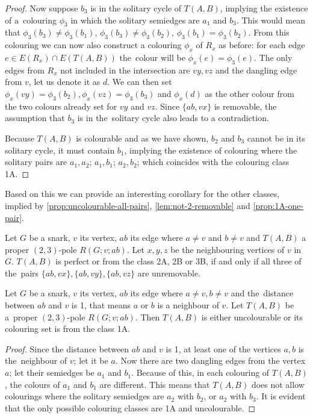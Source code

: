 \begin{proof}
	Now suppose $b_3$ is in the solitary cycle of $T(A,B)$, implying the existence of a~colouring $\phi_3$ in which the solitary semiedges are $a_1$ and $b_3$. This would mean that $\phi_3(b_3)\neq \phi_3(b_1)$, $\phi_3(b_3)\neq \phi_3(b_2)$, $\phi_3(b_1)= \phi_3(b_2)$. From this colouring we can now also construct a colouring $\phi_x$ of $R_x$ as before: for each edge $e\in E(R_x)\cap E(T(A,B))$ the~colour will be $\phi_x(e)=\phi_3(e)$. The only edges from $R_x$ not included in the intersection are $vy, vz$ and the dangling edge from $v$, let us denote it as $d$. We can then set $\phi_x(vy)=\phi_3(b_2), \phi_x(vz)=\phi_3(b_3)$ and $\phi_x(d)$ as the other colour from the two colours already set for $vy$ and $vz$. Since $\{ab,vx\}$ is removable, the assumption that $b_3$ is in the~solitary cycle also leads to a contradiction.
	
	Because $T(A,B)$ is colourable and as we have shown, $b_2$ and $b_3$ cannot be in its solitary cycle, it must contain $b_1$, implying the existence of colouring where the solitary pairs are $a_1,a_2$; $a_1,b_1$; $a_2,b_2$; which coincides with the colouring class 1A.
\end{proof}

Based on this we can provide an interesting corollary for the other classes, implied by \cref{prop:uncolourable-all-pairs}, \cref{lem:not-2-removable} and \cref{prop:1A-one-pair}.

\begin{corollary}
	Let $G$ be a snark, $v$ its vertex, $ab$ its edge where $a\neq v$ and $b \neq v$ and $T(A,B)$ a proper $(2,3)$-pole $R(G;v;ab)$. Let $x,y,z$ be the neighbouring vertices of $v$ in $G$. $T(A,B)$ is perfect or from the class 2A, 2B or 3B, if and only if all three of the~pairs $\{ab,vx\}, \{ab,vy\}, \{ab,vz\}$ are unremovable.
	\label{cor:all-3-unremovable}
\end{corollary}

\begin{proposition}
	Let $G$ be a snark, $v$ its vertex, $ab$ its edge where $a\neq v, b \neq v$ and the~distance between $ab$ and $v$ is 1, that means $a$ or $b$ is a neighbour of $v$. Let $T(A,B)$ be a~proper $(2,3)$-pole $R(G;v;ab)$. Then $T(A,B)$ is either uncolourable or its colouring set is from the class 1A.
	\label{prop:distance-one}
\end{proposition}

\begin{proof}
	Since the distance between $ab$ and $v$ is 1, at least one of the vertices $a,b$ is the~neighbour of $v$; let it be $a$. Now there are two dangling edges from the vertex $a$; let their semiedges be $a_1$ and $b_1$. Because of this, in each colouring of $T(A,B)$, the colours of $a_1$ and $b_1$ are different. This means that $T(A,B)$ does not allow colourings where the solitary semiedges are $a_2$ with $b_2$, or $a_2$ with $b_3$. It is evident that the only possible colouring classes are 1A and uncolourable.
\end{proof}